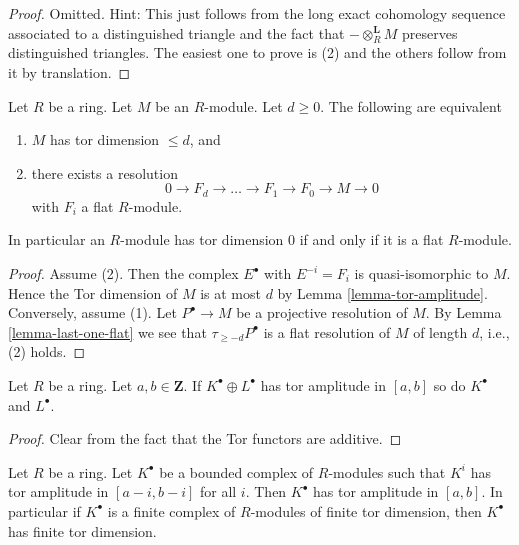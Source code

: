 \begin{proof}
Omitted. Hint: This just follows from the long exact cohomology sequence
associated to a distinguished triangle and the fact that
$- \otimes_R^{\mathbf{L}} M$ preserves distinguished triangles.
The easiest one to prove is (2) and the others follow from it by
translation.
\end{proof}

\begin{lemma}
\label{lemma-tor-dimension}
Let $R$ be a ring. Let $M$ be an $R$-module.
Let $d \geq 0$. The following are equivalent
\begin{enumerate}
\item $M$ has tor dimension $\leq d$, and
\item there exists a resolution
$$
0 \to F_d \to \ldots \to F_1 \to F_0 \to M \to 0
$$
with $F_i$ a flat $R$-module.
\end{enumerate}
In particular an $R$-module has tor dimension $0$ if and only if
it is a flat $R$-module.
\end{lemma}

\begin{proof}
Assume (2). Then the complex $E^\bullet$ with $E^{-i} = F_i$
is quasi-isomorphic to $M$. Hence the Tor dimension of $M$ is
at most $d$ by
Lemma \ref{lemma-tor-amplitude}.
Conversely, assume (1). Let $P^\bullet \to M$ be a projective
resolution of $M$. By
Lemma \ref{lemma-last-one-flat}
we see that $\tau_{\geq -d}P^\bullet$ is a flat resolution of
$M$ of length $d$, i.e., (2) holds.
\end{proof}

\begin{lemma}
\label{lemma-summands-tor-amplitude}
Let $R$ be a ring. Let $a, b \in \mathbf{Z}$.
If $K^\bullet \oplus L^\bullet$ has tor amplitude in $[a, b]$
so do $K^\bullet$ and $L^\bullet$.
\end{lemma}

\begin{proof}
Clear from the fact that the Tor functors are additive.
\end{proof}

\begin{lemma}
\label{lemma-complex-finite-tor-dimension-modules}
Let $R$ be a ring. Let $K^\bullet$ be a bounded complex of $R$-modules
such that $K^i$ has tor amplitude in $[a - i, b - i]$ for all $i$.
Then $K^\bullet$ has tor amplitude in $[a, b]$. In particular
if $K^\bullet$ is a finite complex of $R$-modules of finite tor dimension,
then $K^\bullet$ has finite tor dimension.
\end{lemma}

